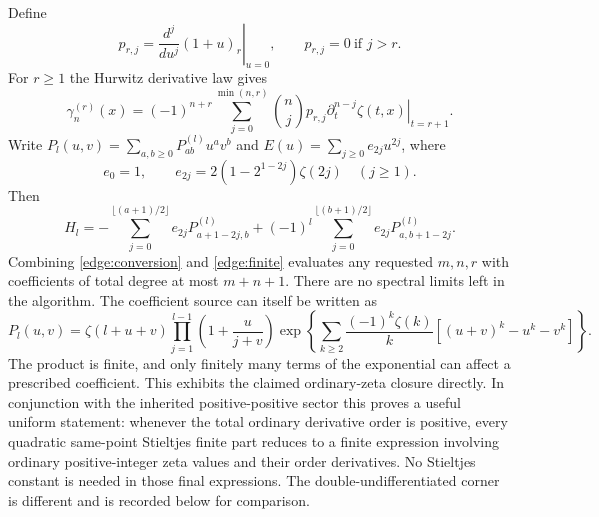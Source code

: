\documentclass[11pt,letterpaper]{article}
\numberwithin{equation}{section}
\theoremstyle{definition}
\theoremstyle{remark}
\begin{document}
Define
\[
 p_{r,j}=\left.\frac{d^j}{du^j}(1+u)_r\right|_{u=0},
 \qquad p_{r,j}=0\ \text{if }j>r.
\]
For $r\ge1$ the Hurwitz derivative law gives
\begin{equation}
 \gamma_n^{(r)}(x)=(-1)^{n+r}
       \sum_{j=0}^{\min(n,r)}\binom nj p_{r,j}
            \left.\partial_t^{n-j}\zeta(t,x)\right|_{t=r+1}.
 \label{edge:conversion}
\end{equation}
Write $P_l(u,v)=\sum_{a,b\ge0}P^{(l)}_{ab}u^av^b$ and
$E(u)=\sum_{j\ge0}e_{2j}u^{2j}$, where
\[
 e_0=1,\qquad e_{2j}=2(1-2^{1-2j})\zeta(2j)\quad(j\ge1).
\]
Then
\begin{equation}
 [u^av^b]H_l=
 -\sum_{j=0}^{\lfloor(a+1)/2\rfloor}e_{2j}P^{(l)}_{a+1-2j,b}
 +(-1)^l\sum_{j=0}^{\lfloor(b+1)/2\rfloor}
                        e_{2j}P^{(l)}_{a,b+1-2j}.
 \label{edge:finite}
\end{equation}
Combining \eqref{edge:conversion} and \eqref{edge:finite} evaluates
any requested $m,n,r$ with coefficients of total degree at most
$m+n+1$.  There are no spectral limits left in the algorithm.
The coefficient source can itself be written as
\begin{equation}
 P_l(u,v)=\zeta(l+u+v)
       \prod_{j=1}^{l-1}\left(1+\frac{u}{j+v}\right)
       \exp\left\{
       \sum_{k\ge2}\frac{(-1)^k\zeta(k)}k
                    [(u+v)^k-u^k-v^k]\right\}.
 \label{edge:coefficient-source}
\end{equation}
The product is finite, and only finitely many terms of the exponential
can affect a prescribed coefficient.  This exhibits the claimed
ordinary-zeta closure directly.
In conjunction with the inherited positive-positive sector this proves
a useful uniform statement: whenever the total ordinary derivative
order is positive, every quadratic same-point Stieltjes finite part
reduces to a finite expression involving ordinary positive-integer
zeta values and their order derivatives.  No Stieltjes constant
is needed in those final expressions.  The double-undifferentiated
corner is different and is recorded below for comparison.
\end{document}
